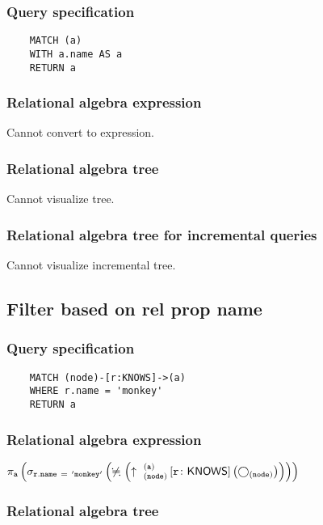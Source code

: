 	\subsubsection*{Query specification}

	\begin{lstlisting}
	MATCH (a)
	WITH a.name AS a
	RETURN a
	\end{lstlisting}


	\subsubsection*{Relational algebra expression}

	Cannot convert to expression.

	\subsubsection*{Relational algebra tree}

	Cannot visualize tree.

	\subsubsection*{Relational algebra tree for incremental queries}

	Cannot visualize incremental tree.
	\subsection{Filter based on rel prop name}

	\subsubsection*{Query specification}

	\begin{lstlisting}
	MATCH (node)-[r:KNOWS]->(a)
	WHERE r.name = 'monkey'
	RETURN a
	\end{lstlisting}


	\subsubsection*{Relational algebra expression}

	$\projection{\var{a}} \left(\selection{\mathtt{r.name~=~'monkey'}} \left(\alldifferent{} \left(\expandout{node}{a}{}{r}{KNOWS} \left(\getvertices{node}{}\right)\right)\right)\right)$

	\subsubsection*{Relational algebra tree}

